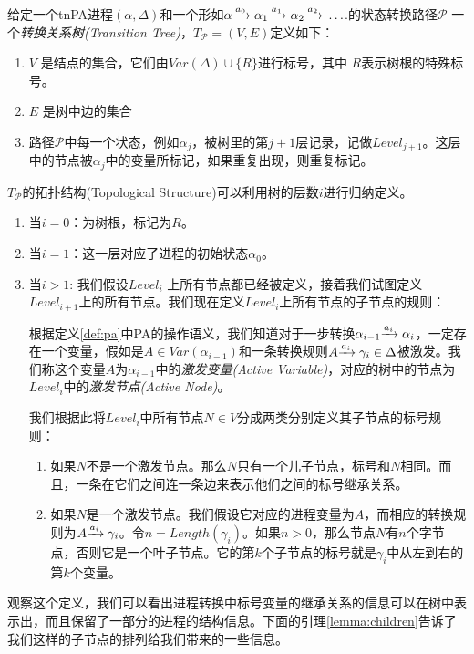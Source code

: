 \begin{defn}[转换关系树]\label{def:trans-tree}

给定一个tnPA进程$(\alpha,\Delta)$和一个形如$\alpha{\xrightarrow{a_0}{}}\alpha_1{\xrightarrow{a_1}{}}\alpha_2{\xrightarrow{a_2}{}}\ldots$.的状态转换路径$\mathcal{P}$
一个\emph{转换关系树(Transition Tree)}，$T_{\mathcal{P}}=(V,E)$定义如下：
\begin{enumerate}
\item $V$ 是结点的集合，它们由$Var(\Delta)\cup \{R\}$进行标号，其中 $R$表示树根的特殊标号。
\item $E$ 是树中边的集合
\item 路径$\mathcal{P}$中每一个状态，例如$\alpha_j$，被树里的第$j+1$层记录，记做$Level_{j+1}$。这层中的节点被$\alpha_j$中的变量所标记，如果重复出现，则重复标记。
\end{enumerate}

$T_{\mathcal{P}}$的拓扑结构(Topological Structure)可以利用树的层数$i$进行归纳定义。
\begin{enumerate}
\item 当$i=0$：为树根，标记为$R$。
\item 当$i=1$：这一层对应了进程的初始状态$\alpha_0$。
\item 当$i>1$: 我们假设$Level_i$ 上所有节点都已经被定义，接着我们试图定义$Level_{i+1}$上的所有节点。我们现在定义$Level_i$上所有节点的子节点的规则：

根据定义\ref{def:pa}中PA的操作语义，我们知道对于一步转换$\alpha_{i-1}{\xrightarrow{a_i}{}}\alpha_{i}$，一定存在一个变量，假如是$A\in Var(\alpha_{i-1})$和一条转换规则$A{\xrightarrow{a_i}{}}\gamma_i\in\Delta$被激发。我们称这个变量$A$为$\alpha_{i-1}$中的\emph{激发变量(Active Variable)}，对应的树中的节点为$Level_i$中的\emph{激发节点(Active Node)}。

我们根据此将$Level_i$中所有节点$N\in V$分成两类分别定义其子节点的标号规则：
\begin{enumerate}
\item 如果$N$不是一个激发节点。那么$N$只有一个儿子节点，标号和$N$相同。而且，一条在它们之间连一条边来表示他们之间的标号继承关系。
\item 如果$N$是一个激发节点。我们假设它对应的进程变量为$A$，而相应的转换规则为$A{\xrightarrow{a_i}{}}\gamma_i$。令$n=Length(\gamma_i)$。如果$n>0$，那么节点$N$有$n$个字节点，否则它是一个叶子节点。它的第$k$个子节点的标号就是$\gamma_i$中从左到右的第$k$个变量。
\end{enumerate}
\end{enumerate}
\end{defn}

观察这个定义，我们可以看出进程转换中标号变量的继承关系的信息可以在树中表示出，而且保留了一部分的进程的结构信息。下面的引理\ref{lemma:children}告诉了我们这样的子节点的排列给我们带来的一些信息。

